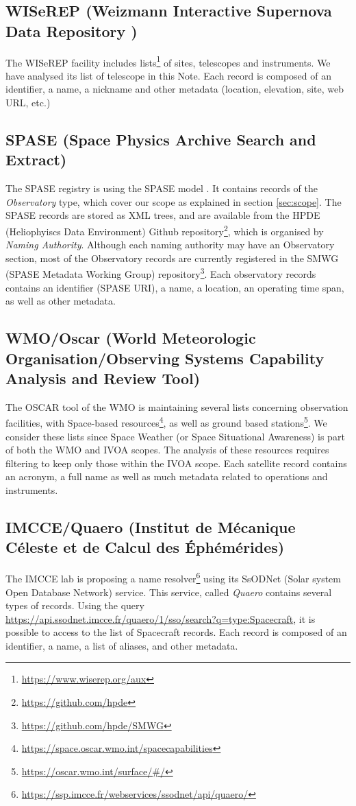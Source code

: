 \documentclass[11pt,a4paper]{ivoa}
\begin{document}
\subsection{WISeREP (Weizmann Interactive Supernova Data Repository )}
The WISeREP facility includes lists\footnote{\url{https://www.wiserep.org/aux}} 
of sites, telescopes and instruments. We have analysed its list of telescope 
in this Note. Each record is composed of an identifier, a name, a 
nickname and other metadata (location, elevation, site, web URL, etc.)

\subsection{SPASE (Space Physics Archive Search and Extract)} 
The SPASE registry is using the SPASE model \citep{Roberts:2018bi}. 
It contains records of the \emph{Observatory} type, which cover our
scope as explained in section \ref{sec:scope}. The SPASE records 
are stored as XML trees, and are available from the HPDE (Heliophyiscs
Data Environment) Github repository\footnote{\url{https://github.com/hpde}},
which is organised by \emph{Naming Authority}. Although each naming 
authority may have an Observatory section, most of the Observatory 
records are currently registered in the SMWG (SPASE Metadata Working
Group) repository\footnote{\url{https://github.com/hpde/SMWG}}.
Each observatory records contains an identifier (SPASE URI), a name, 
a location, an operating time span, as well as other metadata. 


\subsection{WMO/Oscar (World Meteorologic Organisation/Observing Systems Capability Analysis and Review Tool)}
The OSCAR tool of the WMO is maintaining several lists concerning
observation facilities, with Space-based resources\footnote{\url{https://space.oscar.wmo.int/spacecapabilities}}, 
as well as ground based stations\footnote{\url{https://oscar.wmo.int/surface/\#/}}. 
We consider these lists since Space Weather (or Space Situational 
Awareness) is part of both the WMO and IVOA scopes. The analysis of these 
resources requires filtering to keep only those within the IVOA scope.  
Each satellite record contains an acronym, a full name as well as much 
metadata related to operations and instruments.  

\subsection{IMCCE/Quaero (Institut de M\'ecanique C\'eleste et de Calcul des \'Eph\'em\'erides)}
The IMCCE lab is proposing a name resolver\footnote{\url{https://ssp.imcce.fr/webservices/ssodnet/api/quaero/}} 
using its SsODNet (Solar system Open Database Network) service. This
service, called \emph{Quaero} contains several types of records. Using 
the query \url{https://api.ssodnet.imcce.fr/quaero/1/sso/search?q=type:Spacecraft}, 
it is possible to access to the list of Spacecraft records. Each 
record is composed of an identifier, a name, a list of
aliases, and other metadata.
\end{document}
